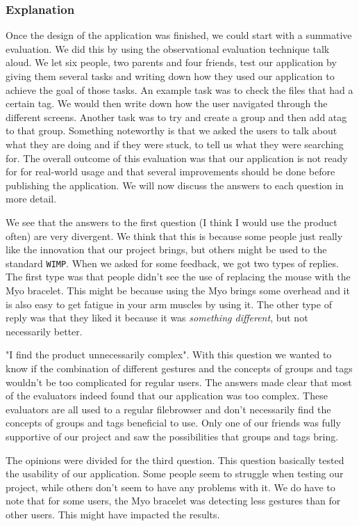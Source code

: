 \documentclass{article}
\begin{document}
\subsubsection{Explanation}

Once the design of the application was finished, we could start with a summative evaluation. We did this by using the observational evaluation technique talk aloud. We let six people, two parents and four friends, test our application by giving them several tasks and writing down how they used our application to achieve the goal of those tasks. An example task was to check the files that had a certain tag. We would then write down how the user navigated through the different screens. Another task was to try and create a group and then add atag to that group. Something noteworthy is that we asked the users to talk about what they are doing and if they were stuck, to tell us what they were searching for. The overall outcome of this evaluation was that our application is not ready for for real-world usage and that several improvements should be done before publishing the application. We will now discuss the answers to each question in more detail.

We see that the answers to the first question (I think I would use the product often) are very divergent. We think that this is because some people just really like the innovation that our project brings, but others might be used to the standard \texttt{WIMP}. When we asked for some feedback, we got two types of replies. The first type was that people didn't see the use of replacing the mouse with the Myo bracelet. This might be because using the Myo brings some overhead and it is also easy to get fatigue in your arm muscles by using it. The other type of reply was that they liked it because it was \textit{something different}, but not necessarily better.

"I find the product unnecessarily complex". With this question we wanted to know if the combination of different gestures and the concepts of groups and tags wouldn't be too complicated for regular users. The answers made clear that most of the evaluators indeed found that our application was too complex. These evaluators are all used to a regular filebrowser and don't necessarily find the concepts of groups and tags beneficial to use. Only one of our friends was fully supportive of our project and saw the possibilities that groups and tags bring.

The opinions were divided for the third question. This question basically tested the usability of our application. Some people seem to struggle when testing our project, while others don't seem to have any problems with it. We do have to note that for some users, the Myo bracelet was detecting less gestures than for other users. This might have impacted the results.
\end{document}
